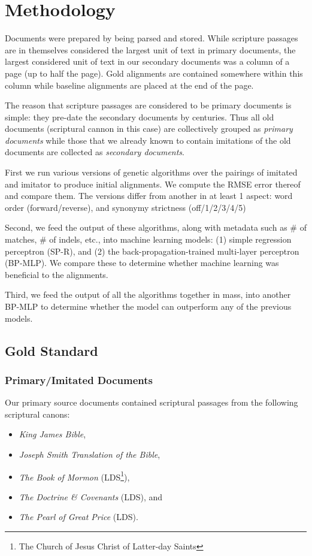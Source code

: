 \section {Methodology}
Documents were prepared by being parsed and stored. While scripture passages are in themselves considered the largest unit of text in primary documents, the largest considered unit of text in our secondary documents was a column of a page (up to half the page). Gold alignments are contained somewhere within this column while baseline alignments are placed at the end of the page.

The reason that scripture passages are considered to be primary documents is simple: they pre-date the secondary documents by centuries. Thus all old documents (scriptural cannon in this case) are collectively grouped as \textit{primary documents} while those that we already known to contain imitations of the old documents are collected as \textit{secondary documents}.

First we run various versions of genetic algorithms over the pairings of imitated and imitator to produce initial alignments. We compute the RMSE error thereof and compare them. The versions differ from another in at least 1 aspect: word order (forward/reverse), and synonymy strictness (off/1/2/3/4/5)

Second, we feed the output of these algorithms, along with metadata such as \# of matches, \# of indels, etc., into machine learning models: (1) simple regression perceptron (SP-R), and (2) the back-propagation-trained multi-layer perceptron (BP-MLP). We compare these to determine whether machine learning was beneficial to the alignments.

Third, we feed the output of all the algorithms together in mass, into another BP-MLP to determine whether the model can outperform any of the previous models.

\subsection{Gold Standard}
\subsubsection{Primary/Imitated Documents}
Our primary source documents contained scriptural passages from the following scriptural canons:
	\begin{itemize}
		\item \textit{King James Bible},
		\item \textit{Joseph Smith Translation of the Bible},
		\item \textit{The Book of Mormon} (LDS\footnote{The Church of Jesus Christ of Latter-day Saints}),
		\item \textit{The Doctrine \& Covenants} (LDS), and
		\item \textit{The Pearl of Great Price} (LDS). 
	\end{itemize}

